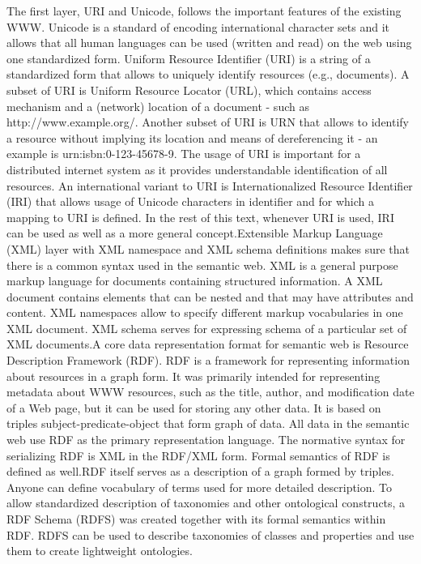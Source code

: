 \documentclass[a4paper,12pt,oneside]{report}
\begin{document}
{{  The first layer, URI and Unicode, follows the important features of the existing WWW. Unicode is a standard of encoding international character sets and it allows that all human languages can be used (written and read) on the web using one standardized form. Uniform Resource Identifier (URI) is a string of a standardized form that allows to uniquely identify resources (e.g., documents). A subset of URI is Uniform Resource Locator (URL), which contains access mechanism and a (network) location of a document - such as http://www.example.org/. Another subset of URI is URN that allows to identify a resource without implying its location and means of dereferencing it - an example is urn:isbn:0-123-45678-9. The usage of URI is important for a distributed internet system as it provides understandable identification of all resources. An international variant to URI is Internationalized Resource Identifier (IRI) that allows usage of Unicode characters in identifier and for which a mapping to URI is defined. In the rest of this text, whenever URI is used, IRI can be used as well as a more general concept.Extensible Markup Language (XML) layer with XML namespace and XML schema definitions makes sure that there is a common syntax used in the semantic web. XML is a general purpose markup language for documents containing structured information. A XML document contains elements that can be nested and that may have attributes and content. XML namespaces allow to specify different markup vocabularies in one XML document. XML schema serves for expressing schema of a particular set of XML documents.A core data representation format for semantic web is Resource Description Framework (RDF). RDF is a framework for representing information about resources in a graph form. It was primarily intended for representing metadata about WWW resources, such as the title, author, and modification date of a Web page, but it can be used for storing any other data. It is based on triples subject-predicate-object that form graph of data. All data in the semantic web use RDF as the primary representation language. The normative syntax for serializing RDF is XML in the RDF/XML form. Formal semantics of RDF is defined as well.RDF itself serves as a description of a graph formed by triples. Anyone can define vocabulary of terms used for more detailed description. To allow standardized description of taxonomies and other ontological constructs, a RDF Schema (RDFS) was created together with its formal semantics within RDF. RDFS can be used to describe taxonomies of classes and properties and use them to create lightweight ontologies.
}}
\end{document}
